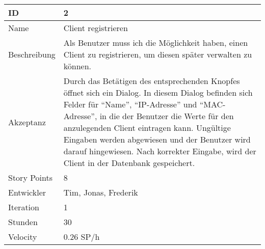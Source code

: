 \begin{table}[htbp]
    \begin{minipage}{\linewidth}
        \setlength{\tymax}{0.5\linewidth}
        \centering
        \small
        \begin{tabulary}{\textwidth}{|l|p{10cm}|} \hline
            ID   &2\\\hline
            Name  &Client registrieren\\\hline
            Beschreibung&Als Benutzer muss ich die Möglichkeit haben, einen Client zu registrieren, um diesen später verwalten zu können.\\\hline
	    Akzeptanz &Durch das Betätigen des entsprechenden Knopfes öffnet sich ein Dialog. In diesem Dialog befinden sich Felder für "`Name"', "`IP-Adresse"' und "`MAC-Adresse"', in die der Benutzer die Werte für den anzulegenden Client eintragen kann. Ungültige Eingaben werden abgewiesen und der Benutzer wird darauf hingewiesen. Nach korrekter Eingabe, wird der Client in der Datenbank gespeichert.\\\hline
            Story Points&8\\\hline
            Entwickler &Tim, Jonas, Frederik\\\hline
            Iteration &1\\\hline
            Stunden  &30\\\hline
            Velocity &0.26 SP\slash h\\\hline
        \end{tabulary}
    \end{minipage}
\end{table}



